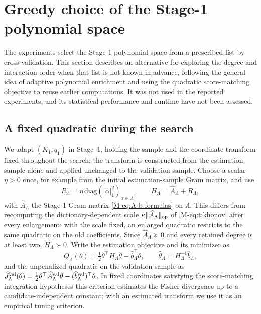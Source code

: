 \documentclass[supplement,review,hidelinks,onefignum,onetabnum]{siamart251216}
\newcommand{\diag}{\mathrm{diag}}
\begin{document}
\section{Greedy choice of the Stage-1 polynomial space}
\label{sm:adaptivity}

The experiments select the Stage-1 polynomial space from a prescribed list by cross-validation. This section describes an alternative for exploring the degree and interaction order when that list is not known in advance, following the general idea of adaptive polynomial enrichment \cite{BlatmanSudret2011} and using the quadratic score-matching objective to reuse earlier computations. It was not used in the reported experiments, and its statistical performance and runtime have not been assessed.

\subsection{A fixed quadratic during the search}
\label{sec:adapt-fixed}

We adapt $(K_1, q_1)$ in Stage~1, holding the sample and the coordinate transform fixed throughout the search; the transform is constructed from the estimation sample alone and applied unchanged to the validation sample. Choose a scalar $\eta > 0$ once, for example from the initial estimation-sample Gram matrix, and use
\[
  R_\Lambda = \eta\,\diag(|\alpha|_1^2)_{\alpha\in\Lambda}, \qquad H_\Lambda = \widehat A_\Lambda + R_\Lambda,
\]
with $\widehat A_\Lambda$ the Stage-1 Gram matrix \eqref{M-eq:A-b-formulas} on $\Lambda$. This differs from recomputing the dictionary-dependent scale $\kappa\|\widehat A_\Lambda\|_{\rm op}$ of \eqref{M-eq:tikhonov} after every enlargement: with the scale fixed, an enlarged quadratic restricts to the same quadratic on the old coefficients. Since $\widehat A_\Lambda \succeq 0$ and every retained degree is at least two, $H_\Lambda \succ 0$. Write the estimation objective and its minimizer as
\[
  Q_\Lambda(\theta) = \tfrac12\theta^\top H_\Lambda\theta - \widehat b_\Lambda^\top\theta, \qquad \widehat\theta_\Lambda = H_\Lambda^{-1}\widehat b_\Lambda,
\]
and the unpenalized quadratic on the validation sample as $\widehat J^{\rm val}_\Lambda(\theta) = \tfrac12\theta^\top\widehat A^{\rm val}_\Lambda\theta - (\widehat b^{\rm val}_\Lambda)^\top\theta$. In fixed coordinates satisfying the score-matching integration hypotheses this criterion estimates the Fisher divergence up to a candidate-independent constant; with an estimated transform we use it as an empirical tuning criterion.
\end{document}

